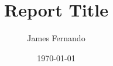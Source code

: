 \documentclass[a4paper,12pt]{scrreprt}
\title{Report Title}
\author{James Fernando}
\date{\today}
\begin{document}
    \begin{titlepage}
        \maketitle
    \end{titlepage}
    \tableofcontents
    
    
    
    

    
     \printbibliography
    
     \begin{appendices}
         
     \end{appendices}
\end{document}
